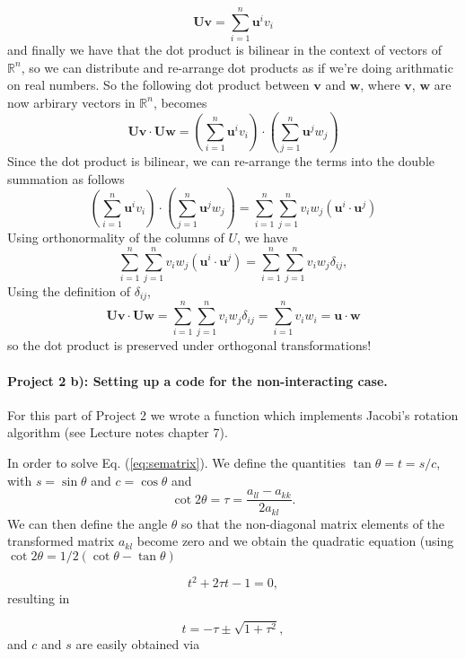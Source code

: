 \documentclass[10pt,showpacs,preprintnumbers,footinbib,amsmath,amssymb,aps,prl,twocolumn,groupedaddress,superscriptaddress,showkeys]{revtex4-1}
\begin{document}
\[
\mathbf{U}\mathbf{v} = \sum\limits_{i=1}^n  \mathbf{u}^i v_i
\]
and finally we have that the dot product is bilinear in the context of vectors of  $\mathbb{R}^n$, so we can distribute and re-arrange dot products as if we're doing arithmatic on real numbers. So the following dot product between $\mathbf{v}$ and $\mathbf{w}$, where $\mathbf{v}$, $\mathbf{w}$ are now arbirary vectors in $\mathbb{R}^n$, becomes
\[
\mathbf{U}\mathbf{v} \cdot \mathbf{U}\mathbf{w} = (\sum\limits_{i=1}^n  \mathbf{u}^i v_i ) \cdot (\sum\limits_{j=1}^n  \mathbf{u}^j w_j)
\]
Since the dot product is bilinear, we can re-arrange the terms into the double summation as follows
\[
(\sum\limits_{i=1}^n  \mathbf{u}^i v_i ) \cdot (\sum\limits_{j=1}^n  \mathbf{u}^j w_j) = \sum\limits_{i=1}^n \sum\limits_{j=1}^n v_i w_j ( \mathbf{u}^i \cdot  \mathbf{u}^j)
\]
Using orthonormality of the columns of $U$, we have
\[
\sum\limits_{i=1}^n \sum\limits_{j=1}^n v_i w_j ( \mathbf{u}^i \cdot  \mathbf{u}^j) = \sum\limits_{i=1}^n \sum\limits_{j=1}^n v_i w_j \delta_{ij},
\]
Using the definition of $\delta_{ij}$,
\[
\mathbf{U}\mathbf{v} \cdot \mathbf{U}\mathbf{w} = \sum\limits_{i=1}^n \sum\limits_{j=1}^n v_i w_j \delta_{ij} = \sum\limits_{i=1}^n v_i w_i = \mathbf{u} \cdot \mathbf{w}
\]
so the dot product is preserved under orthogonal transformations!\newline

\paragraph{Project 2 b): Setting up a code for the non-interacting case.}
For this part of Project 2 we wrote a function which  implements Jacobi's rotation algorithm (see Lecture notes chapter 7).

In order to solve Eq. (\ref{eq:sematrix}).  We define the quantities $\tan\theta = t= s/c$, with $s=\sin\theta$ and $c=\cos\theta$ and
\begin{equation*}\cot 2\theta=\tau = \frac{a_{ll}-a_{kk}}{2a_{kl}}.
\end{equation*}
We can then define the angle $\theta$ so that the non-diagonal matrix elements of the transformed matrix 
$a_{kl}$ become zero and we obtain the quadratic equation (using $\cot 2\theta=1/2(\cot \theta-\tan\theta)$

\begin{equation*}
t^2+2\tau t-1= 0,
\end{equation*}
resulting in

\begin{equation*}
  t = -\tau \pm \sqrt{1+\tau^2},
\end{equation*}
and $c$ and $s$ are easily obtained via
\end{document}
